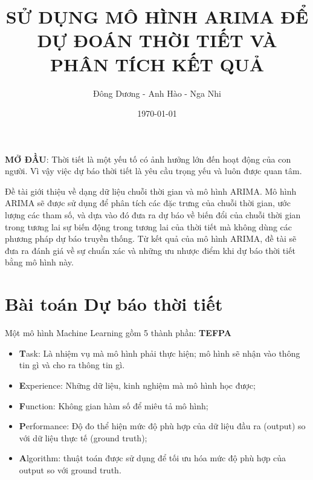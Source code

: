 \documentclass[12pt]{article}
\title{SỬ DỤNG MÔ HÌNH ARIMA ĐỂ DỰ ĐOÁN THỜI TIẾT VÀ PHÂN TÍCH KẾT QUẢ}
\author{Đông Dương - Anh Hào - Nga Nhi}
\date{\small \today}
\begin{document}
\maketitle

\setcounter{page}{1}

\textbf{MỞ ĐẦU}: Thời tiết là một yếu tố có ảnh hưởng lớn đến hoạt động của con người. Vì vậy việc dự báo thời tiết là yêu cầu trọng yếu và luôn được quan tâm.

Đề tài giới thiệu về dạng dữ liệu chuỗi thời gian và mô hình ARIMA. Mô hình ARIMA sẽ được sử dụng để phân tích các đặc trưng của chuỗi thời gian, ước lượng các tham số, và dựa vào đó đưa ra dự báo về biến đổi của chuỗi thời gian trong tương lai sự biến động trong tương lai của thời tiết mà không dùng các phương pháp dự báo truyền thống. Từ kết quả của mô hình ARIMA, đề tài sẽ đưa ra đánh giá về sự chuẩn xác và những ưu nhược điểm khi dự báo thời tiết bằng mô hình này.

\section{Bài toán Dự báo thời tiết}

    Một mô hình Machine Learning gồm 5 thành phần: \textbf{TEFPA}
    \begin{itemize}            
        \item \textbf{T}ask: Là nhiệm vụ mà mô hình phải thực hiện; mô hình sẽ nhận vào thông tin gì và cho ra thông tin gì.
        \item \textbf{E}xperience: Những dữ liệu, kinh nghiệm mà mô hình học được;
        \item \textbf{F}unction: Không gian hàm số để miêu tả mô hình;
        \item \textbf{P}erformance: Độ đo thể hiện mức độ phù hợp của dữ liệu đầu ra (output) so với dữ liệu thực tế (ground truth);
        \item \textbf{A}lgorithm: thuật toán được sử dụng để tối ưu hóa mức độ phù hợp của output so với ground truth.
    \end{itemize}
\end{document}
